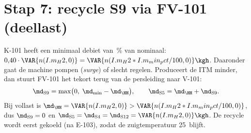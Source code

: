\section{Stap 7: recycle S9 via FV-101 (deellast)}
K-101 heeft een minimaal debiet van \,\% van nominaal: $0{,}40\cdot\VAR{n(I.m_H2,0)} = \VAR{n(I.m_H2*I.m_min_pct/100,0)}\kgh$.
Daaronder gaat de machine pompen (\emph{surge}) of slecht regelen. Produceert de ITM minder, dan stuurt FV-101 het
tekort terug van de persleiding naar V-101:
\[
\md_\mathrm{S9} = \max\!\big(0,\; \md_{\min} - \md_{\HH}\big),\qquad \md_\mathrm{S5} = \md_{\HH} + \md_\mathrm{S9}.
\]
Bij vollast is $\md_{\HH} = \VAR{n(I.m_H2,0)} > \VAR{n(I.m_H2*I.m_min_pct/100,0)}$, dus $\md_\mathrm{S9} = 0$ en
$\md_\mathrm{S5} = \md_\mathrm{S4} = \md_\mathrm{S12} = \VAR{n(I.m_H2,0)}\kgh$. De recycle wordt eerst gekoeld
(na E-103), zodat de zuigtemperatuur 25\degC\ blijft.

